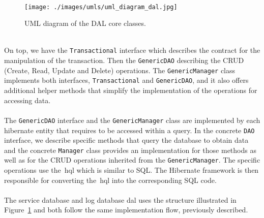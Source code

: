 \\
\begin{figure}[h!]
 \centering
   \texttt{[image: ./images/umls/uml\_diagram\_dal.jpg]}
   \caption{UML diagram of the DAL core classes.}
   \label{fig:dalUMLDiagrama}
\end{figure}
\\
On top, we have the \verb"Transactional" interface which describes the contract for the manipulation of the transaction. Then the \verb"GenericDAO" describing the CRUD (Create, Read, Update and Delete) operations. The \verb"GenericManager" class implements both interfaces, \verb"Transactional" and \verb"GenericDAO", and it also offers additional helper methods that simplify the implementation of the operations for accessing data.\\
\\
The \verb"GenericDAO" interface and the \verb"GenericManager" class are implemented by each hibernate entity that requires to be accessed within a query. In the concrete \verb"DAO" interface, we describe specific methods that query the database to obtain data and the concrete \verb"Manager" class provides an implementation for those methods as well as for the CRUD operations inherited from the \verb"GenericManager". The specific operations use the~\gls{hql} which is similar to SQL. The Hibernate framework is then responsible for converting the~\gls{hql} into the corresponding SQL code.\\
\\
The service database and log database \gls{dal} uses the structure illustrated in Figure~\ref{fig:dalUMLDiagrama} and both follow the same implementation flow, previously described.
